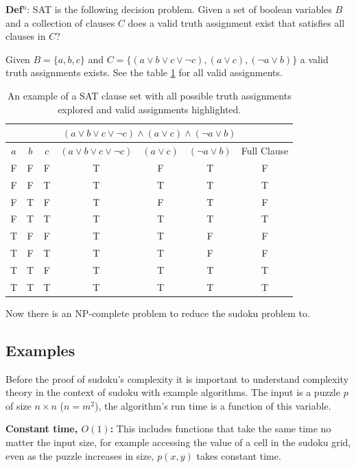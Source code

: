 \documentclass[a4paper,11pt]{report}
\newcounter{row}
\newcounter{col}
\begin{document}
\textbf{Def$^n$}: SAT is the following decision problem. Given a set of boolean variables $B$ and a collection of clauses $C$ does a valid truth assignment exist that satisfies all clauses in $C$?

Given $B = \{a,b,c\}$ and $C=\{(a\lor b \lor c \lor \neg c), (a \lor c), (\neg a\lor b)\}$ a valid truth assignments exists. See the table \ref{satex} for all valid assignments.

\begin{table}
\begin{center}
\begin{tabular}{ |c|c|c|c|c|c|c| }
\hline
\multicolumn{7}{|c|}{$(a\lor b \lor c \lor \neg c)\land (a \lor c) \land (\neg a\lor b)$} \\
\hline
$a$ & $b$ & $c$ & $(a\lor b \lor c \lor \neg c)$ & $(a \lor c)$ & $(\neg a\lor b)$ & Full Clause\\
\hline
F & F & F & T & F & T & F \\
\rowcolor{lightgray}
F & F & T & T & T & T & T \\
F & T & F & T & F & T & F \\
\rowcolor{lightgray}
F & T & T & T & T & T & T \\
T & F & F & T & T & F & F \\
T & F & T & T & T & F & F \\
\rowcolor{lightgray}
T & T & F & T & T & T & T \\
\rowcolor{lightgray}
T & T & T & T & T & T & T \\
\hline
\end{tabular}
\end{center}
\caption{\label{satex}An example of a SAT clause set with all possible truth assignments explored and valid assignments highlighted.}
\end{table}

Now there is an NP-complete problem to reduce the sudoku problem to.

\subsection{Examples}

Before the proof of sudoku's complexity it is important to understand complexity theory in the context of sudoku with example algorithms. The input is a puzzle $p$ of size $n\times n$ ($n=m^2$), the algorithm's run time is a function of this variable.

\textbf{Constant time, $O(1)$:} This includes functions that take the same time no matter the input size, for example accessing the value of a cell in the sudoku grid, even as the puzzle increases in size, $p(x,y)$ takes constant time.
\end{document}
